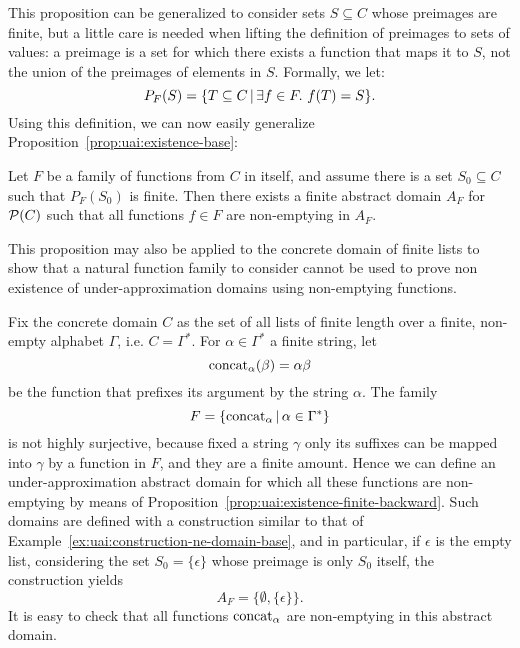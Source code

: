 This proposition can be generalized to consider sets $S \subseteq C$ whose preimages are finite, but a little care is needed when lifting the definition of preimages to sets of values: a preimage is a set for which there exists a function that maps it to $S$, not the union of the preimages of elements in $S$. Formally, we let:
\[
P_F(S) = \{ T \subseteq C \,\vert\, \exists f \in F.~ f(T) = S \} .
\]
Using this definition, we can now easily generalize Proposition~\ref{prop:uai:existence-base}:
\begin{prop}\label{prop:uai:existence-finite-backward}
	Let $F$ be a family of functions from $C$ in itself, and assume there is a set $S_0 \subseteq C$ such that $P_F(S_0)$ is finite. Then there exists a finite abstract domain $A_F$ for $\mathcal{P}(C)$ such that all functions $f \in F$ are non-emptying in $A_F$.
\end{prop}
This proposition may also be applied to the concrete domain of finite lists to show that a natural function family to consider cannot be used to prove non existence of under-approximation domains using non-emptying functions.
\begin{example}\label{ex:uai:construction-ne-domain-backward}
	Fix the concrete domain $C$ as the set of all lists of finite length over a finite, non-empty alphabet $\Gamma$, i.e. $C = \Gamma^{*}$.
	For $\alpha \in \Gamma^*$ a finite string, let
	\[
	\text{concat}_{\alpha}(\beta) = \alpha \beta
	\]
	be the function that prefixes its argument by the string $\alpha$.
	The family
	\[
	F = \{ \text{concat}_{\alpha} \,\vert\, \alpha \in \Gamma^* \}
	\]
	is not highly surjective, because fixed a string $\gamma$ only its suffixes can be mapped into  $\gamma$ by a function in $F$, and they are a finite amount. Hence we can define an under-approximation abstract domain for which all these functions are non-emptying by means of Proposition~\ref{prop:uai:existence-finite-backward}.
	Such domains are defined with a construction similar to that of Example~\ref{ex:uai:construction-ne-domain-base}, and in particular, if $\epsilon$ is the empty list, considering the set $S_0 = \{ \epsilon \}$ whose preimage is only $S_0$ itself, the construction yields
	\[
	A_F = \{ \emptyset, \{ \epsilon \} \} .
	\]
	It is easy to check that all functions $\text{concat}_{\alpha}$ are non-emptying in this abstract domain.
\end{example}

